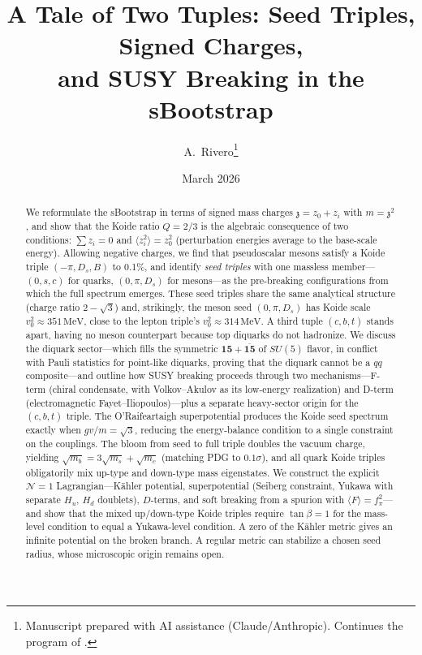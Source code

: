 \documentclass[12pt,a4paper]{article}
\title{A Tale of Two Tuples: Seed Triples, Signed Charges, \\
and SUSY Breaking in the sBootstrap}
\author{A.~Rivero\thanks{Manuscript prepared with AI assistance (Claude/Anthropic). 
Continues the program of \cite{Rivero2005,Rivero2012}.}}
\date{March 2026}
\newcommand{\MeV}{\,\text{MeV}}
\newcommand{\zch}{\mathfrak{z}}
\begin{document}
\maketitle

\begin{abstract}
We reformulate the sBootstrap in terms of signed mass charges 
$\zch = z_0 + z_i$ with $m = \zch^2$, and show that the Koide ratio 
$Q = 2/3$ is the algebraic consequence of two conditions: 
$\sum z_i = 0$ and $\langle z_i^2\rangle = z_0^2$ (perturbation 
energies average to the base-scale energy). Allowing negative charges, 
we find that pseudoscalar mesons satisfy a Koide triple 
$(-\pi, D_s, B)$ to 0.1\%, and identify \emph{seed triples} with 
one massless member---$(0, s, c)$ for quarks, $(0, \pi, D_s)$ for 
mesons---as the pre-breaking configurations from which the full 
spectrum emerges. These seed triples share the same analytical 
structure (charge ratio $2-\sqrt{3}$) and, strikingly, the meson 
seed $(0,\pi,D_s)$ has Koide scale $v_0^2 \approx 351\MeV$,
close to the lepton triple's $v_0^2 \approx 314\MeV$. A third 
tuple $(c,b,t)$ stands apart, having no meson counterpart because 
top diquarks do not hadronize. We discuss the diquark sector---which 
fills the symmetric $\mathbf{15} + \overline{\mathbf{15}}$ of $SU(5)$ 
flavor, in conflict with Pauli statistics for point-like diquarks, 
proving that the diquark cannot be a $qq$ composite---and outline 
how SUSY breaking proceeds through two mechanisms---F-term (chiral
condensate, with Volkov--Akulov as its low-energy realization) and
D-term (electromagnetic Fayet--Iliopoulos)---plus a separate
heavy-sector origin for the $(c,b,t)$ triple. The O'Raifeartaigh
superpotential produces the Koide seed spectrum exactly when
$gv/m = \sqrt{3}$, reducing the energy-balance condition to a
single constraint on the couplings. The bloom from seed to full
triple doubles the vacuum charge, yielding
$\sqrt{m_b} = 3\sqrt{m_s} + \sqrt{m_c}$ (matching PDG to
$0.1\sigma$), and all quark Koide triples obligatorily mix
up-type and down-type mass eigenstates.
We construct the explicit $\mathcal{N}=1$ Lagrangian---K\"ahler
potential, superpotential (Seiberg constraint, Yukawa with
separate $H_u$, $H_d$ doublets),
$D$-terms, and soft breaking from a spurion with
$\langle F\rangle = f_\pi^2$---and show that the mixed up/down-type
Koide triples require $\tan\beta = 1$ for the mass-level condition
to equal a Yukawa-level condition. A zero of the K\"ahler metric
gives an infinite potential on the broken branch. A regular metric can
stabilize a chosen seed radius, whose microscopic origin remains open.

\end{abstract}
\end{document}
